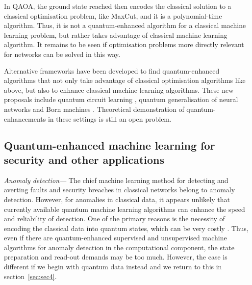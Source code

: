 \documentclass[twocolumn, aps, rmp, amsmath, amssymb, nofootinbib, superscriptaddress, longbibliography, floatfix, table-of-contents, eqsecnum]{revtex4-2}
\begin{document}
In QAOA, the ground state reached then encodes the classical solution to a classical optimisation problem, like MaxCut, and it is a polynomial-time algorithm. Thus, it is not a quantum-enhanced algorithm for a classical machine learning problem, but rather takes advantage of classical machine learning algorithm. It remains to be seen if optimisation problems more directly relevant for networks can be solved in this way.

Alternative frameworks have been developed to find quantum-enhanced algorithms that not only take advantage of classical optimisation algorithms like above, but also to enhance classical machine learning algorithms. These new proposals include quantum circuit learning \cite{mitarai2018quantum}, quantum generalisation of neural networks \cite{wan2017quantum} and Born machines \cite{cheng2018information, benedetti2018generative}. Theoretical demonstration of quantum-enhancements in these settings is still an open problem.




\subsection{Quantum-enhanced machine learning for security and other applications}
\textit{Anomaly detection---} The chief machine learning method for detecting and averting faults and security breaches in classical networks belong to anomaly detection. However, for anomalies in classical data, it appears unlikely that currently available quantum machine learning algorithms can enhance the speed and reliability of detection. One of the primary reasons is the necessity of encoding the classical data into quantum states, which can be very costly \cite{aaronson2015read}. Thus, even if there are quantum-enhanced supervised and unsupervised machine algorithms for anomaly detection in the computational component, the state preparation and read-out demands may be too much. However, the case is different if we begin with quantum data instead and we return to this in section~\ref{sec:sec4}.
\end{document}
